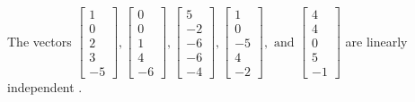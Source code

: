 \begin{exercise}
\begin{exerciseStatement}
  \end{exerciseStatement}
  \begin{exerciseAnswer}
   The vectors \(\left[\begin{array}{r}
1 \\
0 \\
2 \\
3 \\
-5
\end{array}\right] , \left[\begin{array}{r}
0 \\
0 \\
1 \\
4 \\
-6
\end{array}\right] , \left[\begin{array}{r}
5 \\
-2 \\
-6 \\
-6 \\
-4
\end{array}\right] , \left[\begin{array}{r}
1 \\
0 \\
-5 \\
4 \\
-2
\end{array}\right] , \text{ and } \left[\begin{array}{r}
4 \\
4 \\
0 \\
5 \\
-1
\end{array}\right]\) are 
  	 linearly independent  .
  


  \end{exerciseAnswer}
\end{exercise}